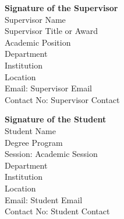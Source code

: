 \documentclass[a4paper,12pt]{article}
\begin{document}
\printbibliography

\vspace*{\fill}
{
\small
\begin{minipage}[t]{0.4\textwidth}
    \textbf{Signature of the Supervisor} \\
    Supervisor Name \\
    Supervisor Title or Award \\
    Academic Position \\
    Department \\
    Institution \\
    Location \\
    Email: Supervisor Email \\
    Contact No: Supervisor Contact
\end{minipage}
\hfill
\begin{minipage}[t]{0.4\textwidth}
    \textbf{Signature of the Student} \\
    Student Name \\
    Degree Program \\
    Session: Academic Session \\
    Department \\
    Institution \\
    Location \\
    Email: Student Email \\
    Contact No: Student Contact
\end{minipage}
}
\end{document}
